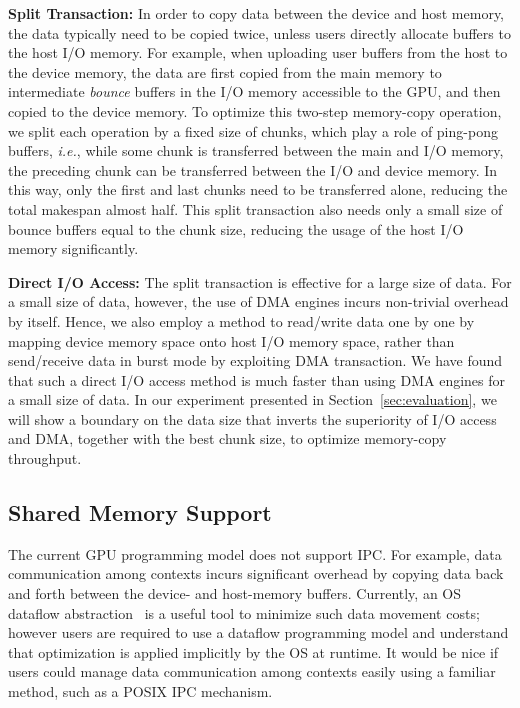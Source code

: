 \textbf{Split Transaction:}
In order to copy data between the device and host memory, the data
typically need to be copied twice, unless users directly allocate
buffers to the host I/O memory. 
For example, when uploading user buffers from the host to the device
memory, the data are first copied from the main memory to intermediate
\textit{bounce} buffers in the I/O memory accessible to the GPU, and
then copied to the device memory.
To optimize this two-step memory-copy operation, we split each operation
by a fixed size of chunks, which play a role of ping-pong buffers,
\textit{i.e.}, while some chunk is transferred between the main and I/O
memory, the preceding chunk can be transferred between the I/O and
device memory.
In this way, only the first and last chunks need to be transferred
alone, reducing the total makespan almost half.
This split transaction also needs only a small size of bounce buffers
equal to the chunk size, reducing the usage of the host I/O memory
significantly.

\textbf{Direct I/O Access:}
The split transaction is effective for a large size of data.
For a small size of data, however, the use of DMA engines incurs
non-trivial overhead by itself.
Hence, we also employ a method to read/write data one by one by mapping
device memory space onto host I/O memory space, rather than send/receive
data in burst mode by exploiting DMA transaction.
We have found that such a direct I/O access method is much faster than
using DMA engines for a small size of data.
In our experiment presented in Section~\ref{sec:evaluation}, we will
show a boundary on the data size that inverts the superiority of I/O
access and DMA, together with the best chunk size, to optimize
memory-copy throughput.

\vspace{-0.25em}
\subsection{Shared Memory Support}
\label{sec:shared_memory}
\vspace{-0.25em}

The current GPU programming model does not support IPC.
For example, data communication among contexts incurs significant
overhead by copying data back and forth between the device- and
host-memory buffers.
Currently, an OS dataflow abstraction~\cite{Rossbach_SOSP11} is a useful
tool to minimize such data movement costs; however users are required to
use a dataflow programming model and understand that optimization is
applied implicitly by the OS at runtime.
It would be nice if users could manage data communication among contexts
easily using a familiar method, such as a POSIX IPC mechanism.

